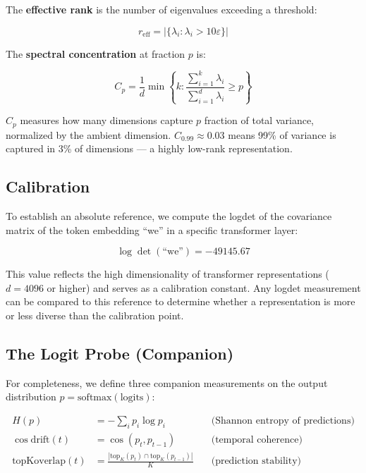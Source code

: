 \documentclass[12pt,a4paper]{article}
\begin{document}
The \textbf{effective rank} is the number of eigenvalues exceeding a threshold:

\begin{equation}
r_\text{eff} = |\{\lambda_i : \lambda_i > 10\varepsilon\}|
\end{equation}

The \textbf{spectral concentration} at fraction $p$ is:

\begin{equation}
C_p = \frac{1}{d}\min\left\{k : \frac{\sum_{i=1}^k \lambda_i}{\sum_{i=1}^d \lambda_i} \geq p\right\}
\end{equation}

$C_p$ measures how many dimensions capture $p$ fraction of total variance, normalized by the ambient dimension. $C_{0.99} \approx 0.03$ means 99\% of variance is captured in 3\% of dimensions --- a highly low-rank representation.

\subsection{Calibration}

To establish an absolute reference, we compute the logdet of the covariance matrix of the token embedding ``we'' in a specific transformer layer:

\begin{equation}
\boxed{\log\det(\text{``we''}) = -49145.67}
\end{equation}

This value reflects the high dimensionality of transformer representations ($d = 4096$ or higher) and serves as a calibration constant. Any logdet measurement can be compared to this reference to determine whether a representation is more or less diverse than the calibration point.

\subsection{The Logit Probe (Companion)}

For completeness, we define three companion measurements on the output distribution $p = \text{softmax}(\text{logits})$:

\begin{align}
H(p) &= -\sum_i p_i \log p_i \quad &\text{(Shannon entropy of predictions)} \label{eq:entropy}\\
\cos\text{drift}(t) &= \cos(p_t, p_{t-1}) \quad &\text{(temporal coherence)} \label{eq:drift}\\
\text{topKoverlap}(t) &= \frac{|\text{top}_K(p_t) \cap \text{top}_K(p_{t-1})|}{K} \quad &\text{(prediction stability)} \label{eq:overlap}
\end{align}
\end{document}
